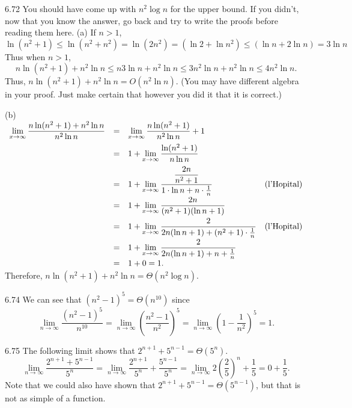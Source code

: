 \begin{Answer}{6.72}
You should have come up with $n^2\log n$ for the upper bound.  If you didn't,
now that you know the answer, go back and try to write the proofs before
reading them here.
(a)
If $n> 1$,
$$\ln (n^2+1) \leq \ln (n^2+n^2)= \ln (2 n^2) =
( \ln 2+ \ln n^2) \leq ( \ln n+ 2\ln n) =3\ln n$$
Thus when $n > 1$,
$$ n\ln (n^2+1) + n^2\ln n\leq n 3\ln n+n^2\ln n\leq
3 n^2 \ln n+n^2\ln n\leq  4 n^2 \ln n. $$
Thus, $n\ln (n^2+1) + n^2\ln n=O(n^2 \ln n).$
(You may have different algebra in your proof.  Just make certain
that however you did it that it is correct.)

(b)
$
\begin{array}[t]{llll}
\displaystyle\lim_{x\rightarrow\infty} \dfrac{{n\ln (n^2+1) + n^2\ln n}}{ n^2\ln n}
& =& \displaystyle\lim_{x\rightarrow\infty}
\dfrac{n\ln (n^2+1)}{ n^2\ln n}  + 1\\[.125in]
& =& \displaystyle1+ \lim_{x\rightarrow\infty}
\dfrac{\ln (n^2+1)}{ n\ln n} \\[.125in]
& =& \displaystyle1+ \lim_{x\rightarrow\infty}
\dfrac{\dfrac{2n}{n^2+1}}{1\cdot\ln n+n\cdot\frac{1}{n}} &\mbox{(l'Hopital)}\\[.125in]
& =& \displaystyle1+ \lim_{x\rightarrow\infty}
\dfrac{2n}{(n^2+1)(\ln n+1)} \\[.125in]
& =&\displaystyle 1+ \lim_{x\rightarrow\infty}
\dfrac{2}{2n(\ln n + 1) + (n^2+1)\cdot\frac{1}{n}} &\mbox{(l'Hopital)}\\[.125in]
& =&\displaystyle 1+ \lim_{x\rightarrow\infty}
\dfrac{2}{2n(\ln n + 1) + n+\frac{1}{n}}\\
&=&1+0=1.
\end{array}
$\\
Therefore,  $n\ln (n^2+1) + n^2\ln n=\Theta(n^2\log n)$.
\end{Answer}
\begin{Answer}{6.74}
We can see that $(n^2-1)^5=\Theta(n^{10})$ since
$$\lim_{n\rightarrow\infty}\frac{(n^2-1)^5}{n^{10}}
=\lim_{n\rightarrow\infty}\left(\frac{n^2-1}{n^2}\right)^5
=\lim_{n\rightarrow\infty}\left(1 - \frac{1}{n^2}\right)^5
=1
.$$
\end{Answer}
\begin{Answer}{6.75}
The following limit shows that $2^{n+1}+5^{n-1}=\Theta(5^n)$.
$$\lim_{n\rightarrow\infty}\frac{2^{n+1}+5^{n-1}}{5^n}
=\lim_{n\rightarrow\infty}\frac{2^{n+1}}{5^n}+\frac{5^{n-1}}{5^n}
=\lim_{n\rightarrow\infty}2\left(\frac{2}{5}\right)^n+\frac{1}{5}
=0+\frac{1}{5}.
$$
Note that we could also have shown that $2^{n+1}+5^{n-1}=\Theta(5^{n-1})$,
but that is not as simple of a function.
\end{Answer}
